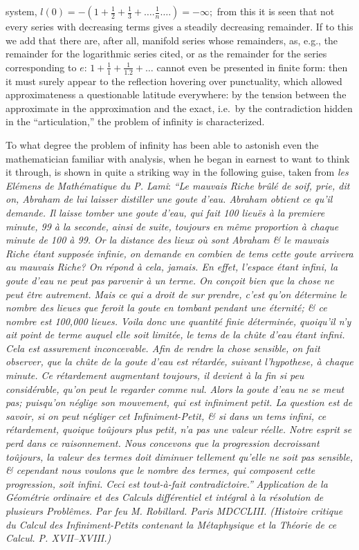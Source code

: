 \documentclass[12pt,a4paper,openany]{book}
\newcommand{\opage}[1]{\marginnote{\footnotesize\textit{[#1]}}}
\begin{document}
system, $l(0)=-\left(1+\frac{1}{2}+\frac{1}{3}+\ldots.\frac{1}{n}\ldots.\right)=-\infty;$ from this it is seen that not every series with decreasing terms gives a steadily decreasing remainder. If to this we add that there are, after all, manifold series whose remainders, as, e.g., the remainder for the logarithmic series cited, or as the remainder for the series corresponding to $e$: $1+\frac{1}{1}+\frac{1}{1.2}+\ldots$ cannot even be presented in finite form: then it must surely appear to the reflection hovering over punctuality, which allowed approximateness a questionable latitude everywhere: by the tension between the approximate in the approximation and the exact, i.e.\ by the contradiction hidden in the ``articulation,'' the problem of infinity is characterized.

To what degree the problem of infinity has been able to astonish even the mathematician familiar with analysis, when he began in earnest to want to think it through, is shown in quite a striking way in the following guise, taken from \textit{les Elémens de Mathématique du P. Lami}: \textit{``Le
mauvais Riche brûlé de soif, prie, dit on, Abraham de
lui laisser distiller une goute d'eau. Abraham obtient
ce qu'il demande. Il laisse tomber une goute d'eau,
qui fait 100 lieuës à la premiere minute, 99 à la seconde,
ainsi de suite, toujours en même proportion à
chaque minute de 100 à 99. Or la distance des lieux
où sont Abraham \& le mauvais Riche étant supposée
infinie, on demande en combien de tems cette goute
arrivera au mauvais Riche? On répond à cela, jamais.
En effet, l'espace étant infini, la goute d'eau ne peut
pas parvenir à un terme. On conçoit bien que la chose
ne peut être autrement. Mais ce qui a droit de sur}%
\setcounter{footnote}{0}%
\opage{56}\textit{prendre, c'est qu'on détermine le nombre des lieues que
feroit la goute en tombant pendant une éternité; \& ce
nombre est 100,000 lieues. Voila donc une quantité
finie déterminée, quoiqu'il n'y ait point de terme auquel
elle soit limitée, le tems de la chûte d'eau étant infini.
Cela est assurement inconcevable. Afin de rendre la
chose sensible, on fait observer, que la chûte de la
goute d'eau est rétardée, suivant l'hypothese, à chaque
minute. Ce rétardement augmentant toujours, il devient
à la fin si peu considérable, qu'on peut le regarder
comme nul. Alors la goute d'eau ne se meut pas;
puisqu'on néglige son mouvement, qui est infiniment petit.
La question est de savoir, si on peut négliger cet Infiniment-Petit, \& si dans un tems infini, ce rétardement,
quoique toûjours plus petit, n'a pas une valeur réelle.
Notre esprit se perd dans ce raisonnement. Nous concevons
que la progression decroissant toûjours, la valeur
des termes doit diminuer tellement qu'elle ne soit pas
sensible, \& cependant nous voulons que le nombre des
termes, qui composent cette progression, soit infini.
Ceci est tout-à-fait contradictoire.''}
\textit{Application de la
Géométrie ordinaire et des Calculs différentiel et intégral
à la résolution de plusieurs Problêmes. Par feu
M. Robillard. Paris MDCCLIII. (Histoire critique du Calcul
des Infiniment-Petits contenant la Métaphysique et la
Théorie de ce Calcul. P. XVII--XVIII.)}
\end{document}
